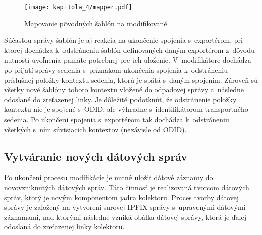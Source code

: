 \begin{figure}[ht]
    \centering
    \texttt{[image: kapitola\_4/mapper.pdf]}
    \caption{Mapovanie pôvodných šablón na modifikované}
    \label{fig:modifier_mapper}
\end{figure}

Súčasťou správy šablón je aj reakcia na ukončenie spojenia s~exportérom, pri ktorej dochádza k~odstráneniu šablón definovaných daným exportérom z~dôvodu nutnosti uvoľnenia pamäte potrebnej pre ich uloženie. V~modifikátore dochádza po prijatí správy sedenia s~príznakom ukončenia spojenia
k~odstráneniu príslušnej položky kontextu sedenia, ktorá je spätá s~daným spojením. Zároveň sú všetky nové šablóny tohoto kontextu vložené do odpadovej správy a~následne odoslané do zreťazenej linky. Je dôležité podotknúť, že odstránenie položky kontextu nie je spojené s~ODID, ale výhradne
s~identifikátorom transportného sedenia. Po ukončení spojenia s~exportérom tak dochádza k~odstráneniu všetkých s~ním súvisiacich kontextov (nezávisle od ODID).


\subsection*{Vytváranie nových dátových správ}

Po ukončení procesu modifikácie je nutné uložiť dátové záznamy do novovzniknutých dátových správ. Táto činnosť je realizovaná tvorcom dátových správ, ktorý je novým komponentom jadra kolektoru. Proces tvorby dátovej správy je založený
na vytvorení surovej IPFIX správy s~upravenými dátovými záznamami, nad ktorými následne vzniká obálka dátovej správy, ktorá je ďalej odoslaná do zreťazenej linky kolektoru.

